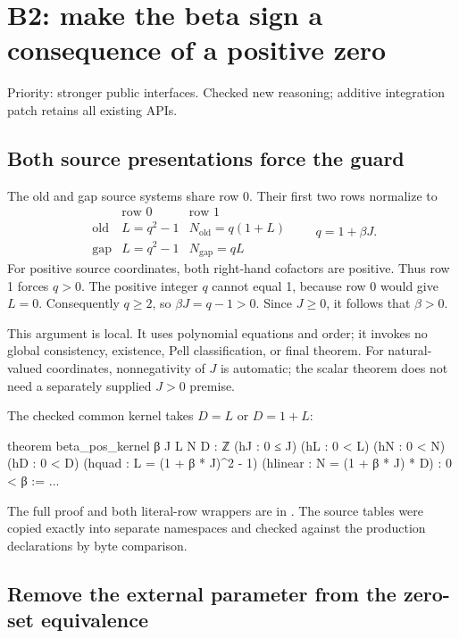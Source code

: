 \documentclass[10pt,a4paper]{article}
\newcommand{\code}[1]{\texttt{\detokenize{#1}}}
\newcommand{\status}[1]{\textsf{\small\color{muted}#1}}
\begin{document}
\section{B2: make the beta sign a consequence of a positive zero}

\status{Priority: stronger public interfaces. Checked new reasoning; additive integration patch retains all existing APIs.}

\subsection{Both source presentations force the guard}

The old and gap source systems share row 0. Their first two rows normalize to
\[
\begin{array}{c|c|c}
 & \text{row 0} & \text{row 1}\\ \hline
\text{old} & L=q^2-1 & N_{\mathrm{old}}=q(1+L)\\
\text{gap} & L=q^2-1 & N_{\mathrm{gap}}=qL
\end{array}
\qquad q=1+\beta J.
\]
For positive source coordinates, both right-hand cofactors are positive. Thus row 1 forces $q>0$. The positive integer $q$ cannot equal 1, because row 0 would give $L=0$. Consequently $q\ge2$, so $\beta J=q-1>0$. Since $J\ge0$, it follows that $\beta>0$.\cite{split,gap}

This argument is local. It uses polynomial equations and order; it invokes no global consistency, existence, Pell classification, or final theorem. For natural-valued coordinates, nonnegativity of $J$ is automatic; the scalar theorem does not need a separately supplied $J>0$ premise.

The checked common kernel takes $D=L$ or $D=1+L$:

\begin{Lean}
theorem beta_pos_kernel {β J L N D : ℤ}
    (hJ : 0 ≤ J) (hL : 0 < L)
    (hN : 0 < N) (hD : 0 < D)
    (hquad : L = (1 + β * J)^2 - 1)
    (hlinear : N = (1 + β * J) * D) : 0 < β := ...
\end{Lean}

The full proof and both literal-row wrappers are in \code{GuardDischarge.lean}. The source tables were copied exactly into separate namespaces and checked against the production declarations by byte comparison.

\subsection{Remove the external parameter from the zero-set equivalence}
\end{document}
